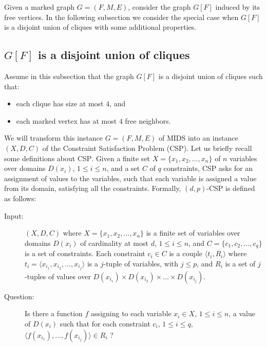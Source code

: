 \documentclass[a4paper,10pt]{article}
\theoremstyle{plain}
\theoremstyle{definition}
\theoremstyle{remark}
\newcommand{\MIDSpb}{\textsc{MIDS}\xspace}
\newcommand{\CSPpb}{\textsc{CSP}\xspace}
\begin{document}
\medskip

Given a marked graph $G=(F,M,E)$, consider the graph $G[F]$ induced by
its free vertices. In the following subsection we consider the special case
when $G[F]$ is a disjoint union of cliques with some additional properties.


\subsection{$G[F]$ is a disjoint union of cliques}
\label{sec:cliques}

Assume in this subsection that the graph $G[F]$ is a disjoint union of cliques such that:
\begin{itemize}
\item each clique has size at most $4$, and
\item each marked vertex has at most $4$ free neighbors.
\end{itemize}

We will transform this instance $G=(F,M,E)$ of \MIDSpb into an instance
$(X,D,C)$ of the Constraint Satisfaction Problem (\CSPpb). Let us
briefly recall some definitions about \CSPpb.
Given a finite set $X= \{x_1, x_2, \dots, x_n\}$ of $n$ variables over domains $D(x_i)$,
$1\leq i \leq n$, and a set $C$ of $q$ constraints, \CSPpb asks for
an assignment of values to the variables, such that each variable is assigned a value from its domain,
satisfying all the constraints.
Formally, $(d,p)$-\CSPpb is defined as follows:



\begin{description}
\item[Input:] $(X,D,C)$ where $X=\{x_1, x_2, \dots , x_n\}$
is a finite set of variables over domains $D(x_i)$ of
cardinality at most $d$, $1 \leq i \leq n$,
and $C=\{c_1, c_2, ..., c_q\}$ is a set of constraints.
Each constraint $c_i \in C$ is a couple $\langle t_i,R_i\rangle$
where $t_i= \langle x_{i_1}, x_{i_2}, \dots, x_{i_j} \rangle$ is a $j$-tuple of variables, with $j \le p$,
and $R_i$ is a set of $j$-tuples of values over $D(x_{i_1}) \times D(x_{i_2}) \times \dots \times D(x_{i_j})$.

\item[Question:] Is there a function $f$ assigning to each variable $x_i \in X$, $1\leq i \leq n$,
a value of $D(x_i)$ such that for each constraint $c_i$, $1 \leq i \leq q$,
$\langle f(x_{i_1}), ..., f(x_{i_j}) \rangle \in R_i$ ?
\end{description}
\end{document}
